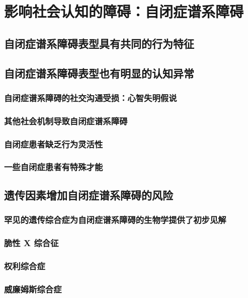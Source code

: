 \chapter{影响社会认知的障碍：自闭症谱系障碍}

\section{自闭症谱系障碍表型具有共同的行为特征}

\section{自闭症谱系障碍表型也有明显的认知异常}
\subsection{自闭症谱系障碍的社交沟通受损：心智失明假说}
\subsection{其他社会机制导致自闭症谱系障碍}
\subsection{自闭症患者缺乏行为灵活性}
\subsection{一些自闭症患者有特殊才能}

\section{遗传因素增加自闭症谱系障碍的风险}
\subsection{罕见的遗传综合症为自闭症谱系障碍的生物学提供了初步见解}
\subsection{脆性 X 综合征}
\subsection{权利综合症}
\subsection{威廉姆斯综合症}

